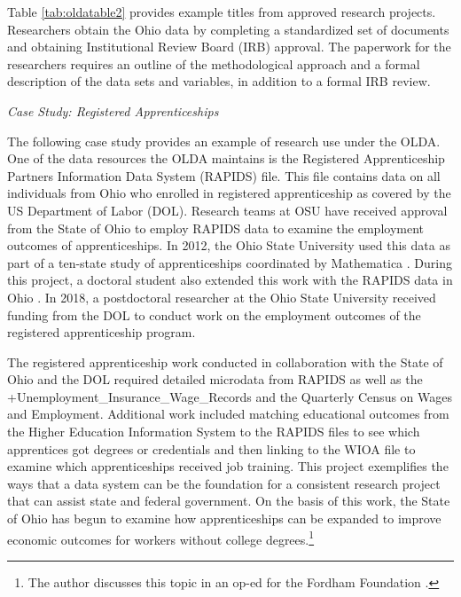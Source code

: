 \documentclass[
]{book}
\begin{document}
Table \ref{tab:oldatable2} provides example titles from approved research projects. Researchers obtain the Ohio data by completing a standardized set of documents and obtaining Institutional Review Board (IRB) approval. The paperwork for the researchers requires an outline of the methodological approach and a formal description of the data sets and variables, in addition to a formal IRB review.

\emph{Case Study: Registered Apprenticeships}

The following case study provides an example of research use under the OLDA. One of the data resources the OLDA maintains is the Registered Apprenticeship Partners Information Data System (RAPIDS) file. This file contains data on all individuals from Ohio who enrolled in registered apprenticeship as covered by the US Department of Labor (DOL). Research teams at OSU have received approval from the State of Ohio to employ RAPIDS data to examine the employment outcomes of apprenticeships. In 2012, the Ohio State University used this data as part of a ten-state study of apprenticeships coordinated by Mathematica \citep{reed2012}. During this project, a doctoral student also extended this work with the RAPIDS data in Ohio \citep{hsu2013}. In 2018, a postdoctoral researcher at the Ohio State University received funding from the DOL to conduct work on the employment outcomes of the registered apprenticeship program.

The registered apprenticeship work conducted in collaboration with the State of Ohio and the DOL required detailed microdata from RAPIDS as well as the +Unemployment\_Insurance\_Wage\_Records\textbar{} and the Quarterly Census on Wages and Employment. Additional work included matching educational outcomes from the Higher Education Information System to the RAPIDS files to see which apprentices got degrees or credentials and then linking to the WIOA file to examine which apprenticeships received job training. This project exemplifies the ways that a data system can be the foundation for a consistent research project that can assist state and federal government. On the basis of this work, the State of Ohio has begun to examine how apprenticeships can be expanded to improve economic outcomes for workers without college degrees.\footnote{The author discusses this topic in an op-ed for the Fordham Foundation \citep{hawley2017a}.}
\end{document}
